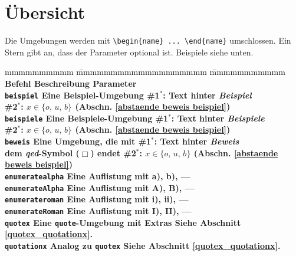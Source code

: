 		\section{Übersicht}
			Die Umgebungen werden mit \verb|\begin{name} ... \end{name}| umschlossen. Ein Stern gibt an, dass der Parameter optional ist. Beispiele siehe unten.
			\begin{tabbing}
				mmmmmmmmmm				\= mmmmmmmmmmmmmmmmmmm					\= mmmmmmmmmmm									\kill
				\bf Befehl				\> \bf Beschreibung						\> \bf Parameter 								\\
				\verb|beispiel|			\> Eine \textbf{Beispiel}-Umgebung 		\> \#1${}^*$: Text hinter \emph{Beispiel} 		\\
										\>										\> \#2${}^*$: $x \in \{o, \, u, \, b\}$ (Abschn. \ref{abstaende beweis beispiel}) \\	
				\verb|beispiele|		\> Eine \textbf{Beispiele}-Umgebung 	\> \#1${}^*$: Text hinter \emph{Beispiele} 	\\
										\>										\> \#2${}^*$: $x \in \{o, \, u, \, b\}$ (Abschn. \ref{abstaende beweis beispiel}) \\	
				\verb|beweis|			\> Eine Umgebung, die mit 				\> \#1${}^*$: Text hinter \emph{Beweis}		\\
										\> dem \emph{qed}-Symbol ($\Box$) endet	\> \#2${}^*$: $x \in \{o, \, u, \, b\}$ (Abschn. \ref{abstaende beweis beispiel})		\\
				\verb|enumeratealpha|	\> Eine Auflistung mit a), b), \ellipse	\> ---											\\
				\verb|enumerateAlpha|	\> Eine Auflistung mit A), B), \ellipse \> ---											\\
				\verb|enumerateroman|	\> Eine Auflistung mit i), ii), \ellipse\> ---											\\
				\verb|enumerateRoman|	\> Eine Auflistung mit I), II), \ellipse\> ---											\\
				\verb|quotex|			\> Eine \texttt{quote}-Umgebung mit Extras
																		\> Siehe Abschnitt \ref{quotex_quotationx}.			\\
				\verb|quotationx|		\>	Analog zu \texttt{quotex}	\> Siehe Abschnitt \ref{quotex_quotationx}.
			\end{tabbing}
			

